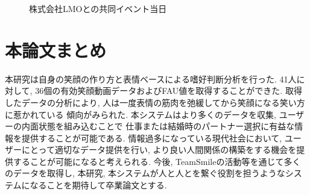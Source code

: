 \begin{figure}[htbp]
    \begin{center}
    \end{center}
    \caption{株式会社LMOとの共同イベント当日}
    \label{fig:kyushu}
\end{figure}

\section{本論文まとめ}
本研究は自身の笑顔の作り方と表情ベースによる嗜好判断分析を行った.
41人に対して, 36個の有効笑顔動画データおよびFAU値を取得することができた.
取得したデータの分析により, 人は一度表情の筋肉を弛緩してから笑顔になる笑い方に惹かれている
傾向がみられた.
本システムはより多くのデータを収集, ユーザーの内面状態を組み込むことで
仕事または結婚時のパートナー選択に有益な情報を提供することが可能である.
情報過多になっている現代社会において, ユーザーにとって適切なデータ提供を行い,
より良い人間関係の構築をする機会を提供することが可能になると考えられる.
今後, TeamSmileの活動等を通じて多くのデータを取得し,
本研究, 本システムが人と人とを繋ぐ役割を担うようなシステムになることを期待して卒業論文とする.
